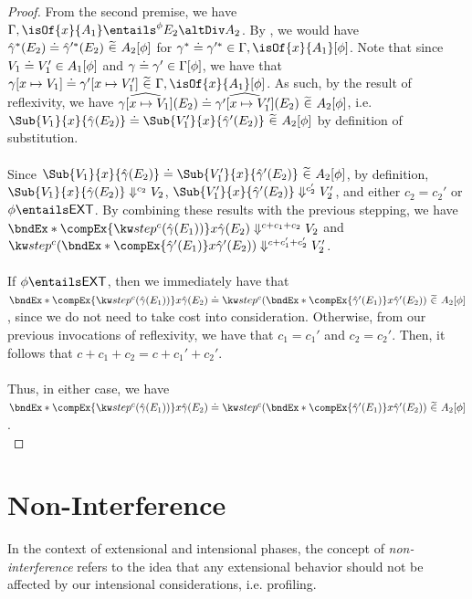 \documentclass[letterpaper]{article}
\newcommand{\EXT}{\textsf{EXT}}
\newcommand{\gyat}{\hat{\gamma}}
\begin{document}
\begin{proof}
    From the second premise, we have $\Gamma, \isOf{x}{A_1} \entailsPhase{\phi} E_2 \altDiv A_2$. By , we would have $\compEqOfPhase{\gyat^*(E_2)}{\gyat'^*(E_2)}{A_2}{\phi}$ for $\exEqOfPhase{\gamma^*}{\gamma'^*}{\Gamma, \isOf{x}{A_1}}{\phi}$.
    Note that since $V_1\mathrel{\doteq}V_1' \in A_1 [\phi]$ and $\gamma\mathrel{\doteq}\gamma' \in \Gamma [\phi]$, we have that $\compEqOfPhase{\gamma[x \mapsto V_1]}{\gamma'[x \mapsto V_1']}{\Gamma, \isOf{x}{A_1}}{\phi}$.  As such, by the result of reflexivity, we have
    $\widehat{\gamma[x \mapsto V_1]}(E_2)\mathrel{\doteq}\widehat{\gamma'[x \mapsto V_1']}(E_2)\ \widetilde{\in}\ A_2 [\phi]$, i.e. $\compEqOfPhase{\Sub{V_1}{x}{\gyat(E_2)}}{\Sub{V_1'}{x}{\gyat'(E_2)}}{A_2}{\phi}$ by definition of substitution.\\\\
    Since $\compEqOfPhase{\Sub{V_1}{x}{\gyat(E_2)}}{\Sub{V_1'}{x}{\gyat'(E_2)}}{A_2}{\phi}$, by definition, $\Sub{V_1}{x}{\gyat(E_2)} \evalsToC{c_2} V_2$, $\Sub{V_1'}{x}{\gyat'(E_2)} \evalsToC{c_2'} V_2'$, and either $c_2 = c_2'$ or $\phi \entails \EXT$.
    By combining these results with the previous stepping, we have $\bndEx*{\compEx{\stepEx{c}{\gyat(E_1)}}}{x}{\gyat(E_2)} \evalsToC{c + c_1 + c_2} V_2$ and $\stepEx{c}{\bndEx*{\compEx{\gyat'(E_1)}}{x}{\gyat'(E_2)}} \evalsToC{c + c_1' + c_2'} V_2'$.\\\\
    If $\phi \entails \EXT$, then we immediately have that $\compEqOfPhase{\bndEx*{\compEx{\stepEx{c}{\gyat(E_1)}}}{x}{\gyat(E_2)}}{\stepEx{c}{\bndEx*{\compEx{\gyat'(E_1)}}{x}{\gyat'(E_2)}}}{A_2}{\phi}$, since we do not need to take cost into consideration. Otherwise,
    from our previous invocations of reflexivity, we have that $c_1 = c_1'$ and $c_2 = c_2'$. Then, it follows that $c + c_1 + c_2 = c + c_1' + c_2'$.\\\\
    Thus, in either case, we have $\compEqOfPhase{\bndEx*{\compEx{\stepEx{c}{\gyat(E_1)}}}{x}{\gyat(E_2)}}{\stepEx{c}{\bndEx*{\compEx{\gyat'(E_1)}}{x}{\gyat'(E_2)}}}{A_2}{\phi}$.\\
\end{proof}

\section{Non-Interference}

In the context of extensional and intensional phases, the concept of \textit{non-interference} refers to the idea that any extensional behavior should not be affected by our intensional considerations, i.e. profiling.
\end{document}
